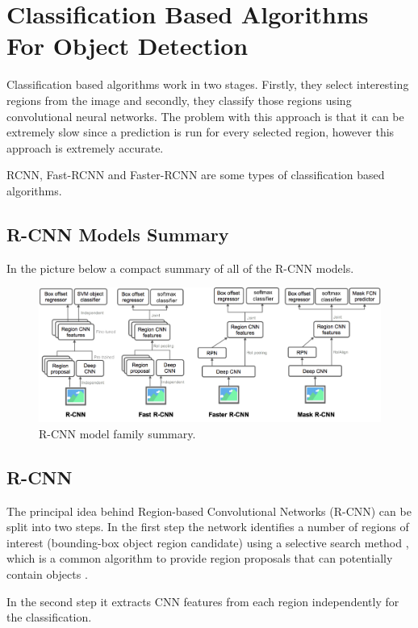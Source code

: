    

\section{Classification Based Algorithms For Object Detection}
\label{sec:classification}

\par Classification based algorithms work in two stages. Firstly, they select interesting regions from the image and secondly, they classify those regions using convolutional neural networks. The problem with this approach is that it can be extremely slow since a prediction is run for every selected region, however this approach is extremely accurate. \cite{Lin2017} 
\par RCNN, Fast-RCNN and Faster-RCNN are some types of classification based algorithms.  

    \subsection{R-CNN Models Summary}

    \par In the picture below a  compact summary of all of the R-CNN models.

    \begin{figure}[htb]
        \centering
        \includegraphics[scale = 0.2]{Sections/2StateOfTheArt/2_images/rcnn-family-summary.png}
        \caption{R-CNN model family summary. \cite{weng2017detection3}} 
    \end{figure}



    \subsection{R-CNN}
    
    \par The principal idea behind Region-based Convolutional Networks (R-CNN) can be split into two steps. In the first step the network identifies a number of regions of interest (bounding-box object region candidate) using a selective search method \cite{weng2017detection3}, which is a common algorithm to provide region proposals that can potentially contain objects \cite{weng2017detection1}.
    \par In the second step it extracts CNN features from each region independently for the classification.

